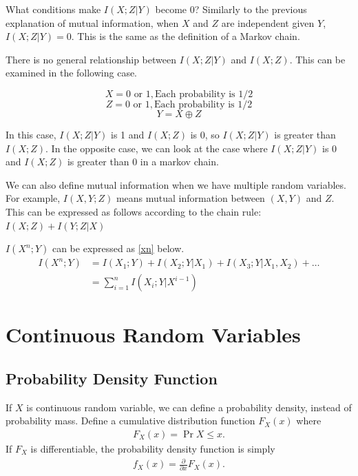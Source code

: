 \documentclass{article}
\begin{document}
What conditions make $I(X; Z|Y )$ become 0? 
Similarly to the previous explanation of mutual information, when $X$ and $Z$ are independent given $Y$, $I(X;Z|Y) = 0$.
This is the same as the definition of a Markov chain.

\begin{remark}
There is no general relationship between $I(X;Z|Y)$ and $I(X;Z)$.
This can be examined in the following case.

\begin{equation}
    X = 0 \text{ or } 1, \text{Each probability is 1/2}
\end{equation}
\begin{equation}
    Z = 0 \text{ or } 1, \text{Each probability is 1/2}
\end{equation}
\begin{equation}
    Y = X \oplus Z
\end{equation}

In this case, $I(X;Z|Y)$ is 1 and $I(X;Z)$ is 0, so $I(X;Z|Y)$ is greater than $I(X;Z)$.
In the opposite case, we can look at the case where $I(X;Z|Y)$ is 0 and $I(X;Z)$ is greater than 0 in a markov chain.
\end{remark}

We can also define mutual information when we have multiple random variables.
For example, $I(X,Y;Z)$ means mutual information between $(X,Y)$ and $Z$.
This can be expressed as follows according to the chain rule: $I(X;Z) + I(Y;Z|X)$

$I(X^n;Y)$ can be expressed as \eqref{xn} below.
\begin{equation}
\begin{aligned}
    \label{xn}
    I(X^n;Y) &= I(X_1;Y) +I(X_2;Y|X_1)+I(X_3;Y|X_1,X_2) +\dots\\ 
    &=\sum_{i=1}^{n} I(X_i;Y|X^{i-1})
\end{aligned}
\end{equation}





\section{Continuous Random Variables}
\subsection{Probability Density Function}
If $X$ is continuous random variable, we can define a probability density, instead of probability mass.
Define a cumulative distribution function $F_X(x)$ where
\begin{align}
    F_X(x) = \Pr{X\leq x}.
\end{align}
If $F_X$ is differentiable, the probability density function is simply
\begin{align}
    f_X(x) = \frac{\partial}{\partial x} F_X(x).
\end{align}
\end{document}
